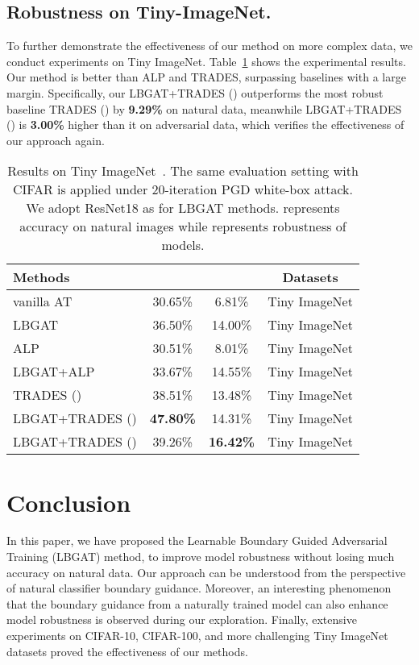 \documentclass[10pt,twocolumn,letterpaper]{article}
\begin{document}
\subsection{Robustness on Tiny-ImageNet.}
To further demonstrate the effectiveness of our method on more complex data, we conduct experiments on Tiny ImageNet. Table~\ref{tab:Tiny_ImageNet} shows the experimental results. Our method is better than ALP and TRADES, surpassing baselines with a large margin. Specifically, our LBGAT+TRADES () outperforms the most robust baseline TRADES () by \textbf{9.29\%} on natural data, meanwhile LBGAT+TRADES () is \textbf{3.00\%} higher than it on adversarial data, which verifies the effectiveness of our approach again.

\begin{table}[h]
	\centering
	\caption{Results on Tiny ImageNet~\cite{DBLP:conf/cvpr/DengDSLL009}. The same evaluation setting with CIFAR is applied under 20-iteration PGD white-box attack. We adopt ResNet18 as  for LBGAT methods.  represents accuracy on natural images while  represents robustness of models.} 
	\resizebox{.99\linewidth}{!}
	{
	\begin{tabular}{l|c|c|c}
		\textbf{Methods} & & &\textbf{Datasets} \\
		\hline
		\hline
		vanilla AT  &30.65\% &6.81\%  &Tiny ImageNet\\
		LBGAT       &36.50\% &14.00\% &Tiny ImageNet \\
		ALP         &30.51\% &8.01\% &Tiny ImageNet \\
		LBGAT+ALP   &33.67\% &14.55\% &Tiny ImageNet \\
		TRADES ()  &38.51\% &13.48\% &Tiny ImageNet \\
		LBGAT+TRADES () &\textbf{47.80\%} &14.31\% &Tiny ImageNet \\
		LBGAT+TRADES () &39.26\% &\textbf{16.42\%} &Tiny ImageNet \\
		\hline
		\hline
	\end{tabular}
	\label{tab:Tiny_ImageNet}
    }
\vspace{-0.1in}
\end{table}

\section{Conclusion}
In this paper, we have proposed the Learnable Boundary Guided Adversarial Training (LBGAT) method, to improve model robustness without losing much accuracy on natural data. Our approach can be understood from the perspective of natural classifier boundary guidance. Moreover, an interesting phenomenon that the boundary guidance from a naturally trained model can also enhance model robustness is observed during our exploration. Finally, extensive experiments on CIFAR-10, CIFAR-100, and more challenging Tiny ImageNet datasets proved the effectiveness of our methods.
\end{document}
